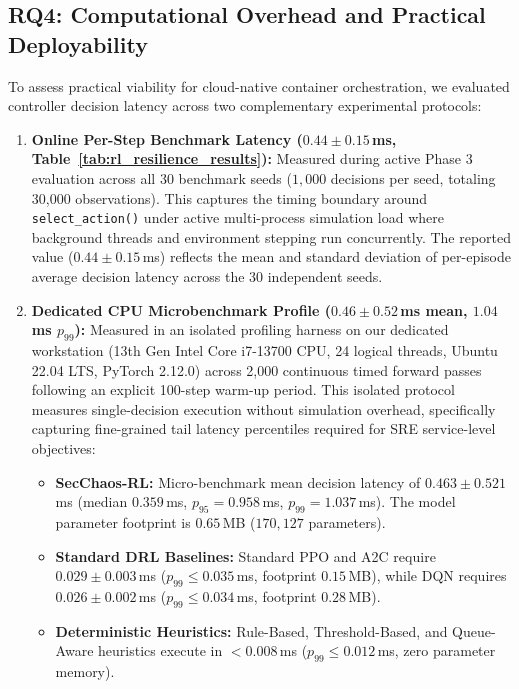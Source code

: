 \documentclass[11pt,a4paper]{article}
\begin{document}
\subsection{RQ4: Computational Overhead and Practical Deployability}
To assess practical viability for cloud-native container orchestration, we evaluated controller decision latency across two complementary experimental protocols:
\begin{enumerate}
    \item \textbf{Online Per-Step Benchmark Latency ($0.44 \pm 0.15$\,ms, Table~\ref{tab:rl_resilience_results}):} Measured during active Phase 3 evaluation across all 30 benchmark seeds ($1,000$ decisions per seed, totaling 30,000 observations). This captures the timing boundary around \texttt{select\_action()} under active multi-process simulation load where background threads and environment stepping run concurrently. The reported value ($0.44 \pm 0.15$\,ms) reflects the mean and standard deviation of per-episode average decision latency across the 30 independent seeds.
    \item \textbf{Dedicated CPU Microbenchmark Profile ($0.46 \pm 0.52$\,ms mean, $1.04$\,ms $p_{99}$):} Measured in an isolated profiling harness on our dedicated workstation (13th Gen Intel Core i7-13700 CPU, 24 logical threads, Ubuntu 22.04 LTS, PyTorch 2.12.0) across 2,000 continuous timed forward passes following an explicit 100-step warm-up period. This isolated protocol measures single-decision execution without simulation overhead, specifically capturing fine-grained tail latency percentiles required for SRE service-level objectives:
    \begin{itemize}
        \item \textbf{SecChaos-RL:} Micro-benchmark mean decision latency of $\mathbf{0.463 \pm 0.521}$\,ms (median $0.359$\,ms, $p_{95} = 0.958$\,ms, $p_{99} = 1.037$\,ms). The model parameter footprint is $0.65$\,MB ($170,127$ parameters).
        \item \textbf{Standard DRL Baselines:} Standard PPO and A2C require $0.029 \pm 0.003$\,ms ($p_{99} \le 0.035$\,ms, footprint $0.15$\,MB), while DQN requires $0.026 \pm 0.002$\,ms ($p_{99} \le 0.034$\,ms, footprint $0.28$\,MB).
        \item \textbf{Deterministic Heuristics:} Rule-Based, Threshold-Based, and Queue-Aware heuristics execute in $< 0.008$\,ms ($p_{99} \le 0.012$\,ms, zero parameter memory).
    \end{itemize}
\end{enumerate}
\end{document}
